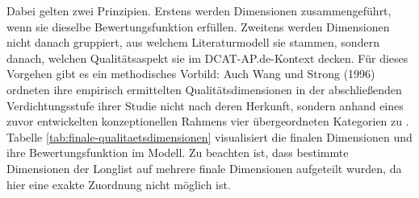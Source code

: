 Dabei gelten zwei Prinzipien. Erstens werden Dimensionen zusammengeführt, wenn sie dieselbe Bewertungsfunktion erfüllen.
Zweitens werden Dimensionen nicht danach gruppiert, aus welchem Literaturmodell sie stammen, sondern danach, welchen Qualitätsaspekt sie im DCAT-AP.de-Kontext decken. Für dieses Vorgehen gibt es ein methodisches Vorbild: Auch Wang und Strong (1996) ordneten ihre empirisch ermittelten Qualitätsdimensionen in der abschließenden Verdichtungsstufe ihrer Studie nicht nach deren Herkunft, sondern anhand eines zuvor entwickelten konzeptionellen Rahmens vier übergeordneten Kategorien zu \cite{wang1996beyond}.
Tabelle \ref{tab:finale-qualitaetsdimensionen} visualisiert die finalen Dimensionen und ihre Bewertungsfunktion im Modell.
Zu beachten ist, dass bestimmte Dimensionen der Longlist auf mehrere finale Dimensionen aufgeteilt wurden, da hier eine exakte Zuordnung nicht möglich ist.

